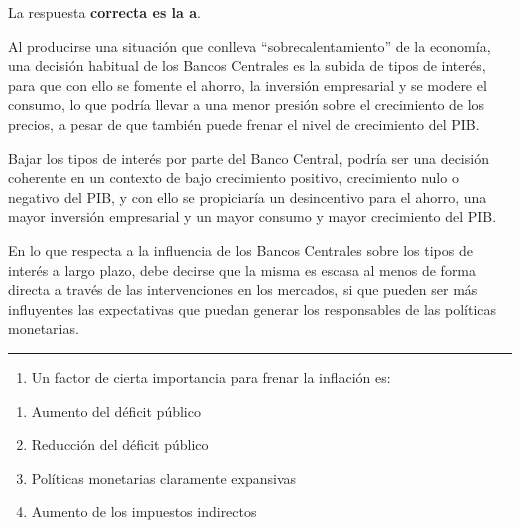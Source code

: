 \documentclass[
  letterpaper,
  DIV=11,
  numbers=noendperiod]{scrreprt}
\providecommand{\tightlist}{%
  \setlength{\itemsep}{0pt}\setlength{\parskip}{0pt}}\usepackage{longtable,booktabs,array}
\begin{document}
\begin{tcolorbox}[enhanced jigsaw, left=2mm, opacityback=0, colback=white, breakable, arc=.35mm, bottomrule=.15mm, rightrule=.15mm, toprule=.15mm, leftrule=.75mm, colframe=quarto-callout-tip-color-frame]
\begin{minipage}[t]{5.5mm}
\textcolor{quarto-callout-tip-color}{\faLightbulb}
\end{minipage}%
\begin{minipage}[t]{\textwidth - 5.5mm}

La respuesta \textbf{correcta es la a}.

Al producirse una situación que conlleva ``sobrecalentamiento'' de la
economía, una decisión habitual de los Bancos Centrales es la subida de
tipos de interés, para que con ello se fomente el ahorro, la inversión
empresarial y se modere el consumo, lo que podría llevar a una menor
presión sobre el crecimiento de los precios, a pesar de que también
puede frenar el nivel de crecimiento del PIB.

Bajar los tipos de interés por parte del Banco Central, podría ser una
decisión coherente en un contexto de bajo crecimiento positivo,
crecimiento nulo o negativo del PIB, y con ello se propiciaría un
desincentivo para el ahorro, una mayor inversión empresarial y un mayor
consumo y mayor crecimiento del PIB.

En lo que respecta a la influencia de los Bancos Centrales sobre los
tipos de interés a largo plazo, debe decirse que la misma es escasa al
menos de forma directa a través de las intervenciones en los mercados,
si que pueden ser más influyentes las expectativas que puedan generar
los responsables de las políticas monetarias.

\end{minipage}%
\end{tcolorbox}

\begin{center}\rule{0.5\linewidth}{0.5pt}\end{center}

\begin{enumerate}
\def\labelenumi{\arabic{enumi}.}
\setcounter{enumi}{11}
\tightlist
\item
  Un factor de cierta importancia para frenar la inflación es:
\end{enumerate}

\begin{enumerate}
\def\labelenumi{\alph{enumi})}
\item
  Aumento del déficit público
\item
  Reducción del déficit público
\item
  Políticas monetarias claramente expansivas
\item
  Aumento de los impuestos indirectos
\end{enumerate}
\end{document}
